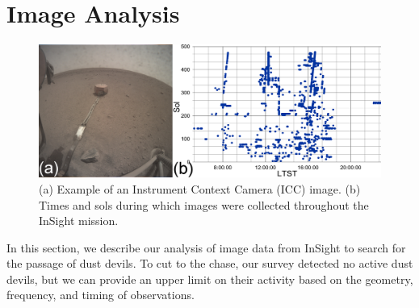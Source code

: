 \documentclass{aastex63}
\begin{document}


\section{Image Analysis}
\label{sec:Image Analysis}

\begin{figure}
    \centering
    \includegraphics[width=\textwidth]{figures/Example-Image_Insight-Combined-Analysis.png}
    \caption{(a) Example of an Instrument Context Camera (ICC) image. (b) Times and sols during which images were collected throughout the InSight mission.}
    \label{fig:Example-Image_Insight-Combined-Analysis}
\end{figure}

In this section, we describe our analysis of image data from InSight to search for the passage of dust devils. To cut to the chase, our survey detected no active dust devils, but we can provide an upper limit on their activity based on the geometry, frequency, and timing of observations.

\end{document}
